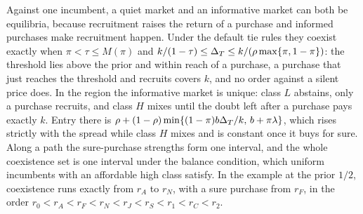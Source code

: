 \begin{chaptersummary}
Against one incumbent, a quiet market and an informative market can both be equilibria, because recruitment raises
the return of a purchase and informed purchases make recruitment happen. Under the default tie rules they coexist
exactly when \(\pi<\tau\le M(\pi)\) and \(k/(1-\tau)\le\Delta_T\le k/(\rho\max\{\pi,1-\pi\})\): the threshold lies above
the prior and within reach of a purchase, a purchase that just reaches the threshold and recruits covers \(k\), and no
order against a silent price does. In the region the informative market is unique: class \(L\) abstains, only a
purchase recruits, and class \(H\) mixes until the doubt left after a purchase pays exactly \(k\). Entry there is
\(\rho+(1-\rho)\min\{(1-\pi)b\Delta_T/k,\,b+\pi\lambda\}\), which rises strictly with the spread while class \(H\) mixes and
is constant once it buys for sure. Along a path the sure-purchase strengths form one interval, and the whole
coexistence set is one interval under the balance condition, which uniform incumbents with an affordable high class
satisfy. In the example at the prior \(1/2\), coexistence runs exactly from \(r_A\) to \(r_N\), with a sure purchase
from \(r_F\), in the order \(r_0<r_A<r_F<r_N<r_J<r_S<r_1<r_C<r_2\).
\end{chaptersummary}

\answersection


